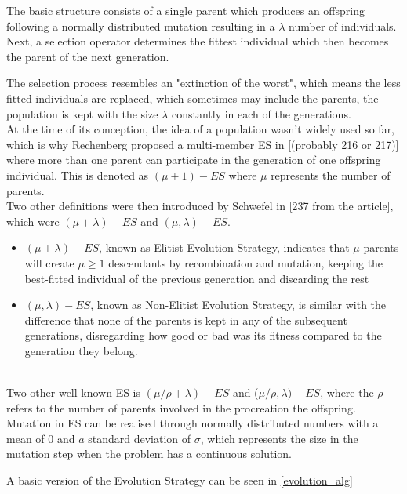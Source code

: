 The basic structure consists of a single parent which produces an offspring following a normally distributed mutation resulting in a $\lambda$ number of individuals. Next, a selection operator determines the fittest individual which then becomes the parent of the next generation.

The selection process resembles an "extinction of the worst", which means the less fitted individuals are replaced, which sometimes may include the parents, the population is kept with the size $\lambda$ constantly in each of the generations.\\

At the time of its conception, the idea of a population wasn't widely used so far, which is why Rechenberg proposed a multi-member ES in [(probably 216 or 217)] where more than one parent can participate in the generation of one offspring individual. This is denoted as $(\mu + 1) - ES$ where $\mu$ represents the number of parents.\\ 

Two other definitions were then introduced by Schwefel in [237 from the article], which were $(\mu + \lambda) - ES$ and $(\mu, \lambda) - ES$.\\

\begin{itemize}
    \item $(\mu + \lambda) - ES$, known as Elitist Evolution Strategy, indicates that $\mu$ parents will create $\mu \geq 1$ descendants by recombination and mutation, keeping the best-fitted individual of the previous generation and discarding the rest
    \item $(\mu, \lambda) - ES$, known as Non-Elitist Evolution Strategy, is similar with the difference that none of the parents is kept in any of the subsequent generations, disregarding how good or bad was its fitness compared to the generation they belong.
\end{itemize}\\

Two other well-known ES is $(\mu/\rho + \lambda) - ES$ and ($\mu/\rho, \lambda) - ES$, where the $\rho$ refers to the number of parents involved in the procreation the offspring. Mutation in ES can be realised through normally distributed numbers with a mean of $0$ and $a$ standard deviation of $\sigma$, which represents the size in the mutation step when the problem has a continuous solution.

A basic version of the Evolution Strategy can be seen in \ref{evolution_alg}

